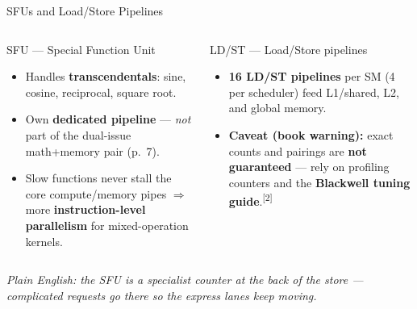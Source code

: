 \documentclass[aspectratio=169]{beamer}
\newcommand{\kw}[1]{\textbf{\textcolor{kwblue}{#1}}}
\newcommand{\pe}[1]{\par{\setlength{\fboxsep}{2.5pt}\noindent\colorbox{navy!9}{\parbox{\dimexpr\textwidth-5pt\relax}{\footnotesize\itshape Plain English: #1}}}}
\newcommand{\refmark}[1]{\textsuperscript{[#1]}}
\begin{document}
\begin{frame}{SFUs and Load/Store Pipelines}
  \begin{columns}[t]
    \begin{block}{SFU --- Special Function Unit}
      \begin{itemize}\small
        \item Handles \kw{transcendentals}: sine, cosine, reciprocal, square root.
        \item Own \kw{dedicated pipeline} --- \emph{not} part of the dual-issue math+memory pair (p.~7).
        \item Slow functions never stall the core compute/memory pipes $\Rightarrow$
              more \kw{instruction-level parallelism} for mixed-operation kernels.
      \end{itemize}
    \end{block}
    \begin{block}{LD/ST --- Load/Store pipelines}
      \begin{itemize}\small
        \item \kw{16 LD/ST pipelines} per SM (4 per scheduler) feed L1/shared, L2, and global memory.
        \item \kw{Caveat (book warning):} exact counts and pairings are \kw{not guaranteed} ---
              rely on profiling counters and the \kw{Blackwell tuning guide}.\refmark{2}
      \end{itemize}
    \end{block}
  \end{columns}
  \pe{the SFU is a specialist counter at the back of the store --- complicated requests go there so the express lanes keep moving.}
\end{frame}
\end{document}
